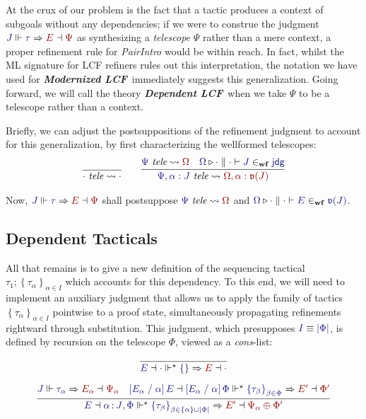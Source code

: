 \documentclass[11pt]{article}
\theoremstyle{definition}
\theoremstyle{remark}
\numberwithin{equation}{section}
\def\IModeColorName{MidnightBlue}
\def\OModeColorName{Maroon}
\newcommand\IMode[1]{{\color{\IModeColorName}{#1}}}
\newcommand\OMode[1]{{\color{\OModeColorName}{#1}}}
\newcommand\JJ{J}
\newcommand\MkSet[1]{\left\{#1\right\}}
\newcommand\MkFam[3]{\MkSet{#1_{#2}}_{#2\in #3}}
\newcommand\IsWf[5]{%
  \IMode{#1}\triangleright%
  \IMode{#2}\parallel%
  \IMode{#3}\vdash%
  \IMode{#4}\in_{\mathbf{wf}}\IMode{#5}%
}
\newcommand\IsTele[2]{
  \IMode{#1}\ \textit{tele}\leadsto \OMode{#2}
}
\newcommand\SortJdg{\mathsf{jdg}}
\newcommand\JdgValence[1]{\mathfrak{v}(#1)}
\newcommand\ISG[2]{\IMode{#1}\,{\color{Black}:}\,\IMode{#2}}
\newcommand\Refine[4]{\IMode{#1}\Vdash\IMode{#2}\Rightarrow\OMode{#4}\dashv\OMode{#3}}
\newcommand\ThenMultiAux[5]{%
  \IMode{#2}\dashv\IMode{#3}%
  \Vdash^\star\IMode{#1}\Rightarrow%
  \OMode{#4}\dashv\OMode{#5}%
}
\newcommand\ThenTac[2]{#1;#2}
\newcommand\Dom[1]{\left\vert#1\right\vert}
\newcommand\Subst[3]{\left[#1\;/\;#2\right]#3}
\newcommand\ModLCF{\textbf{\emph{Modernized LCF}}}
\newcommand\DepLCF{\textbf{\emph{Dependent LCF}}}
\newcommand\IsEquiv[2]{\IMode{#1}\equiv\IMode{#2}}
\begin{document}
At the crux of our problem is the fact that a tactic produces a context of subgoals
without any dependencies; if we were to construe the judgment
$\Refine{\JJ}{\tau}{\Psi}{E}$ as synthesizing a \emph{telescope} $\Psi$ rather
than a mere context, a proper refinement rule for \emph{PairIntro} would be
within reach. In fact, whilst the ML signature for LCF refiners rules out this
interpretation, the notation we have used for \ModLCF\ immediately suggests
this generalization. Going forward, we will call the theory \DepLCF\ when we
take $\Psi$ to be a telescope rather than a context.

Briefly, we can adjust the postsuppositions of the refinement judgment to
account for this generalization, by first characterizing the wellformed
telescopes:
\begin{gather*}
  \infer{
    \IsTele{\cdot}{\cdot}
  }{
  }\qquad
  \infer{
    \IsTele{\Psi,\alpha:\JJ}{\Omega,\alpha:\JdgValence{\JJ}}
  }{
    \IsTele{\Psi}{\Omega} &
    \IsWf{\Omega}{\cdot}{\cdot}{\JJ}{\SortJdg}
  }
\end{gather*}

Now, $\Refine{\JJ}{\tau}{\Psi}{E}$ shall postsuppose $\IsTele{\Psi}{\Omega}$
and $\IsWf{\Omega}{\cdot}{\cdot}{E}{\JdgValence{\JJ}}$.

\subsection{Dependent Tacticals}
All that remains is to give a new definition of the sequencing tactical
$\ThenTac{\tau_1}{\MkFam{\tau}{\alpha}{I}}$ which accounts for this dependency.
To this end, we will need to implement an auxiliary judgment
\framebox{$\ThenMultiAux{\MkFam{\tau}{\alpha}{I}}{E}{\Phi}{E'}{\Phi'}$} that
allows us to apply the family of tactics $\MkFam{\tau}{\alpha}{I}$ pointwise to
a proof state, simultaneously propagating refinements rightward through
substitution. This judgment, which presupposes $\IsEquiv{I}{\Dom\Phi}$, is
defined by recursion on the telescope $\Phi$, viewed as a \emph{cons}-list:

\begin{gather*}
  \infer{
    \ThenMultiAux{\MkSet{}}{E}{\cdot}{E}{\cdot}
  }{
  }\\[6pt]
  \infer{
    \ThenMultiAux{
      \MkFam{\tau}{\beta}{\MkSet{\alpha}\cup\Dom\Phi}
    }{E}{
      \ISG{\alpha}{\JJ},\Phi
    }{E'}{
      \Psi_\alpha\oplus\Phi'
    }
  }{
    \Refine{\JJ}{\tau_\alpha}{\Psi_\alpha}{E_\alpha} &
    \ThenMultiAux{
      \MkFam{\tau}{\beta}{\Phi}
    }{
      \Subst{E_\alpha}{\alpha}{E}%
    }{
      \Subst{E_\alpha}{\alpha}{\Phi}
    }{E'}{\Phi'}
  }
\end{gather*}
\end{document}
